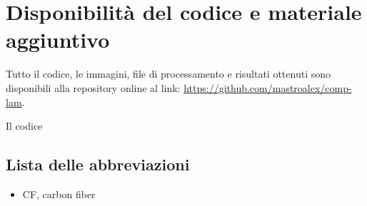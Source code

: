 \documentclass[a4paper,num-refs]{oup-contemporary}
\begin{document}
\textcolor{blue}{\lipsum[1-2]}


\section{Disponibilità del codice e materiale aggiuntivo}

Tutto il codice, le immagini, file di processamento e risultati ottenuti sono disponibili alla repository online al link: \url{https://github.com/mastroalex/comp-lam}. 

Il codice 


\subsection{Lista delle abbreviazioni}

\begin{itemize}
	\item CF, carbon fiber
\end{itemize}
 



\newpage

\end{document}

